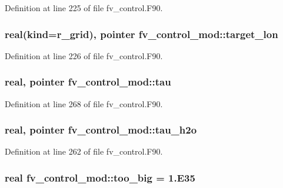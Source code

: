Definition at line 225 of file fv\-\_\-control.\-F90.

\subsubsection[{target\-\_\-lon}]{\setlength{\rightskip}{0pt plus 5cm}real(kind=r\-\_\-grid), pointer fv\-\_\-control\-\_\-mod\-::target\-\_\-lon\hspace{0.3cm}{\ttfamily [private]}}\label{classfv__control__mod_a4be1f3d3b7f0f82146aabd90d5b1aee9}


Definition at line 226 of file fv\-\_\-control.\-F90.

\subsubsection[{tau}]{\setlength{\rightskip}{0pt plus 5cm}real, pointer fv\-\_\-control\-\_\-mod\-::tau\hspace{0.3cm}{\ttfamily [private]}}\label{classfv__control__mod_a9eb0433cb807fe22e9a244bfca40ff21}


Definition at line 268 of file fv\-\_\-control.\-F90.

\subsubsection[{tau\-\_\-h2o}]{\setlength{\rightskip}{0pt plus 5cm}real, pointer fv\-\_\-control\-\_\-mod\-::tau\-\_\-h2o\hspace{0.3cm}{\ttfamily [private]}}\label{classfv__control__mod_a6429af2384662d32d0ac8e8b861f0a31}


Definition at line 262 of file fv\-\_\-control.\-F90.

\subsubsection[{too\-\_\-big}]{\setlength{\rightskip}{0pt plus 5cm}real fv\-\_\-control\-\_\-mod\-::too\-\_\-big = 1.E35\hspace{0.3cm}{\ttfamily [private]}}\label{classfv__control__mod_a6b6be52e25375aff31a0cf50bfada435}



